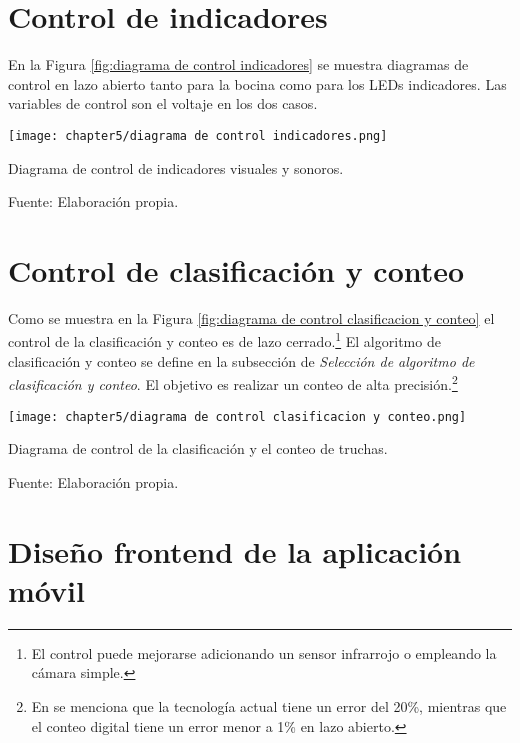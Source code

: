 \section{Control de indicadores}

En la Figura \ref{fig:diagrama de control indicadores} se muestra diagramas de control en lazo abierto tanto para la bocina como para los LEDs indicadores. Las variables de control son el voltaje en los dos casos.

\begin{myfigure}[H]
	\footnotesize\centering
	\texttt{[image: chapter5/diagrama de control indicadores.png]}
	\caption{Diagrama de control de indicadores visuales y sonoros.}
	\begin{myflushcenter}
		Fuente: Elaboración propia.
	\end{myflushcenter}
	\label{fig:diagrama de control indicadores}
\end{myfigure}

\section{Control de clasificación y conteo}

Como se muestra en la Figura \ref{fig:diagrama de control clasificacion y conteo} el control de la clasificación y conteo es de lazo cerrado.\footnote{El control puede mejorarse adicionando un sensor infrarrojo o empleando la cámara simple.} El algoritmo de clasificación y conteo se define en la subsección de \textit{Selección de algoritmo de clasificación y conteo}. El objetivo es realizar un conteo de alta precisión.\footnote{En \cite{Borisovich2016} se menciona que la tecnología actual tiene un error del 20\%, mientras que el conteo digital tiene un error menor a 1\% en lazo abierto.}

\begin{myfigure}[H]
	\footnotesize\centering
	\texttt{[image: chapter5/diagrama de control clasificacion y conteo.png]}
	\caption{Diagrama de control de la clasificación y el conteo de truchas.}
	\begin{myflushcenter}
		Fuente: Elaboración propia.
	\end{myflushcenter}
	\label{fig:diagrama de control clasificacion y conteo}
\end{myfigure}

\section{Diseño frontend de la aplicación móvil}

